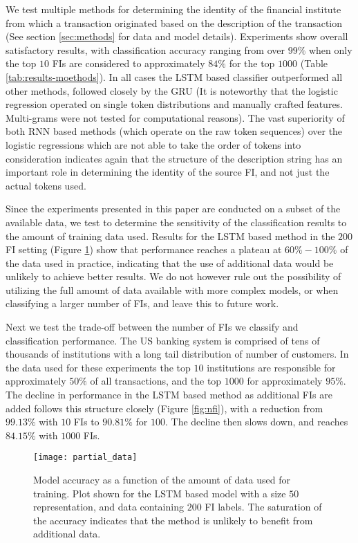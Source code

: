\documentclass[sigconf]{acmart}
\begin{document}
We test multiple methods for determining the identity of the financial institute from which a transaction originated based on the description of the transaction (See section \ref{sec:methods} for data and model details). Experiments show overall satisfactory results, with classification accuracy ranging from over $99\%$ when only the top $10$ FIs are considered to approximately $84\%$ for the top $1000$ (Table \ref{tab:results-moethods}). In all cases the LSTM based classifier outperformed all other methods, followed closely by the GRU (It is noteworthy that the logistic regression operated on single token distributions and manually crafted features. Multi-grams were not tested for computational reasons). The vast superiority of both RNN based methods (which operate on the raw token sequences) over the logistic regressions which are not able to take the order of tokens into consideration indicates again that the structure of the description string has an important role in determining the identity of the source FI, and not just the actual tokens used. 


Since the experiments presented in this paper are conducted on a subset of the available data, we test to determine the sensitivity of the classification results to the amount of training data used. Results for the LSTM based method in the $200$ FI setting (Figure \ref{fig:fracdata}) show that performance reaches a plateau at $60\% - 100\%$ of the data used in practice, indicating that the use of additional data would be unlikely to achieve better results. We do not however rule out the possibility of utilizing the full amount of data available with more complex models, or when classifying a larger number of FIs, and leave this to future work. 

Next we test the trade-off between the number of FIs we classify and classification performance. The US banking system is comprised of tens of thousands of institutions with a long tail distribution of number of customers. In the data used for these experiments the top $10$ institutions are responsible for approximately $50\%$ of all transactions, and the top $1000$ for approximately $95\%$. The decline in performance in the LSTM based method as additional FIs are added follows this structure closely (Figure \ref{fig:nfi}), with a reduction from $99.13\%$ with $10$ FIs to $90.81\%$ for $100$. The decline then slows down, and reaches $84.15\%$ with $1000$ FIs. 


\begin{figure}
\centering{}
\texttt{[image: partial\_data]}
\caption{Model accuracy as a function of the amount of data used for training. Plot shown for the LSTM based model with a size $50$ representation, and data containing $200$ FI labels. The saturation of the accuracy indicates that the method is unlikely to benefit from additional data. }
\label{fig:fracdata}
\end{figure}
\end{document}
